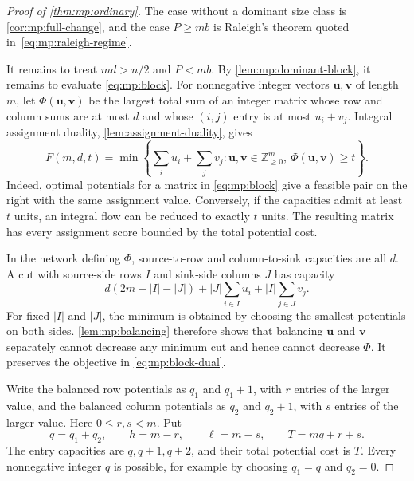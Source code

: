 \documentclass[11pt,reqno]{amsart}
\numberwithin{equation}{section}
\theoremstyle{definition}
\theoremstyle{remark}
\begin{document}
\begin{proof}[Proof of \cref{thm:mp:ordinary}]
The case without a dominant size class is
\cref{cor:mp:full-change}, and the case $P\ge mb$ is
Raleigh's theorem quoted in~\eqref{eq:mp:raleigh-regime}.

It remains to treat $md>n/2$ and $P<mb$.
By \cref{lem:mp:dominant-block}, it remains
to evaluate \eqref{eq:mp:block}. For nonnegative integer vectors
$\mathbf u,\mathbf v$ of length $m$, let $\Phi(\mathbf u,\mathbf v)$
be the largest total sum of an integer matrix whose row and column
sums are at most $d$ and whose $(i,j)$ entry is at most $u_i+v_j$.
Integral assignment duality, \cref{lem:assignment-duality}, gives
\begin{equation}\label{eq:mp:block-dual}
 F(m,d,t)=\min\left\{\sum_i u_i+\sum_jv_j:
 \mathbf u,\mathbf v\in\mathbb Z_{\ge0}^m,
 \ \Phi(\mathbf u,\mathbf v)\ge t\right\}.
\end{equation}
Indeed, optimal potentials for a matrix in \eqref{eq:mp:block} give
a feasible pair on the right with the same assignment value.
Conversely, if the capacities admit at least $t$ units, an integral
flow can be reduced to exactly $t$ units. The resulting matrix has
every assignment score bounded by the total potential cost.

In the network defining $\Phi$, source-to-row and column-to-sink
capacities are all $d$. A cut with source-side rows $I$ and sink-side
columns $J$ has capacity
\begin{equation}\label{eq:mp:block-cut}
 d(2m-|I|-|J|)+|J|\sum_{i\in I}u_i+|I|\sum_{j\in J}v_j.
\end{equation}
For fixed $|I|$ and $|J|$, the minimum is obtained by choosing the
smallest potentials on both sides. \cref{lem:mp:balancing}
therefore shows that balancing $\mathbf u$ and $\mathbf v$ separately
cannot decrease any minimum cut and hence cannot decrease $\Phi$.
It preserves the objective in \eqref{eq:mp:block-dual}.

Write the balanced row potentials as $q_1$ and $q_1+1$, with $r$ entries
of the larger value, and the balanced column potentials as $q_2$ and
$q_2+1$, with $s$ entries of the larger value. Here $0\le r,s<m$.
Put
\[
 q=q_1+q_2,\qquad h=m-r,\qquad \ell=m-s,\qquad T=mq+r+s.
\]
The entry capacities are $q,q+1,q+2$, and their total potential cost is
$T$. Every nonnegative integer $q$ is possible, for example by choosing
$q_1=q$ and $q_2=0$.


\end{proof}
\end{document}

